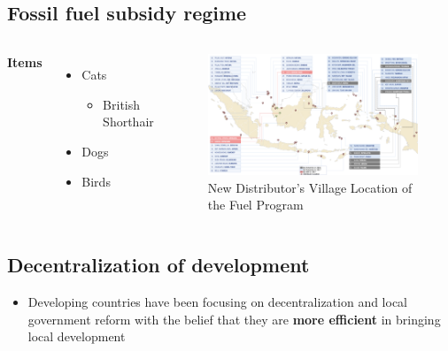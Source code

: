 \documentclass[
11pt,notheorems,compress,hyperref={pdfauthor=Maghfira Ramadhani}
]{beamer}
\begin{document}
\subsection{Fossil fuel subsidy regime}
\begin{frame}
    \begin{columns}[T,onlytextwidth]
      \textbf{Items}
      \begin{itemize}
        \item Cats 
        \begin{itemize}
            \item British Shorthair
        \end{itemize}
        \item Dogs \item Birds
      \end{itemize}

        \begin{figure}[t]
        \includegraphics[scale=0.4]{Final_Project/image/BBM Satu Harga.png}
        \caption{New Distributor's Village Location of the Fuel Program}
        \label{f:graph2}
        \end{figure}
    \end{columns}
\end{frame}

\subsection{Decentralization of development}
\begin{frame}
\begin{itemize}
    \item Developing countries have been focusing on decentralization and local government reform with the belief that they are \alert{\textbf{more efficient}} in bringing local development \citep{vazquez_2017}
\end{itemize}
\end{frame}
\end{document}
